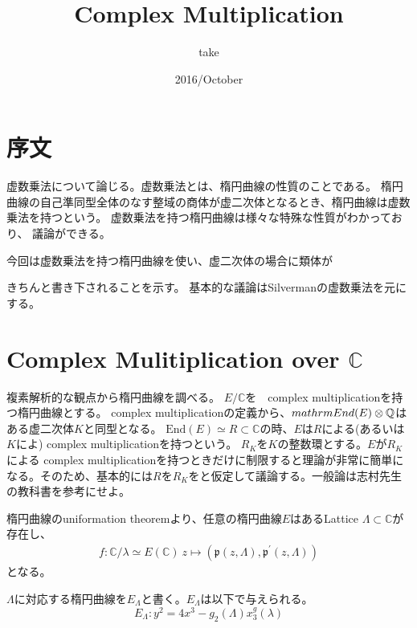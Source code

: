 \documentclass{ujarticle}
\title{Complex Multiplication}
\author{take}
\date{2016/October}
\begin{document}
\section{序文}
\label{sec:序文}
虚数乗法について論じる。虚数乗法とは、楕円曲線の性質のことである。
楕円曲線の自己準同型全体のなす整域の商体が虚二次体となるとき、楕円曲線は虚数乗法を持つという。
虚数乗法を持つ楕円曲線は様々な特殊な性質がわかっており、
議論ができる。

今回は虚数乗法を持つ楕円曲線を使い、虚二次体の場合に類体が

きちんと書き下されることを示す。
基本的な議論はSilvermanの虚数乗法を元にする。


\section{Complex Mulitiplication over $\mathbb{C}$}
\label{sec:Complex Mulitiplication over  mathbbC }

複素解析的な観点から楕円曲線を調べる。
$E/\mathbb{C}$を　complex multiplicationを持つ楕円曲線とする。 complex multiplicationの定義から、$\\mathrm{End}(E) \otimes \mathbb{Q}$はある虚二次体$K$と同型となる。
$\mathrm{End}(E) \simeq R \subset \mathbb{C} $の時、$E$は$R$による(あるいは$K$によ) complex multiplicationを持つという。
$R_K$を$K$の整数環とする。$E$が$R_K$による complex multiplicationを持つときだけに制限すると理論が非常に簡単になる。そのため、基本的には$R$を$R_K$をと仮定して議論する。一般論は志村先生の教科書を参考にせよ。

楕円曲線のuniformation theoremより、任意の楕円曲線$E$はあるLattice $\Lambda \subset \mathbb{C} $が存在し、
\begin{align*}
  f: \mathbb{C}/ \lambda \simeq E(\mathbb{C})   \
  z \mapsto (\mathfrak{p}(z, \Lambda),\mathfrak{p}^{'}(z, \Lambda))
\end{align*}
となる。

$\Lambda$に対応する楕円曲線を$E_{\Lambda}$と書く。$E_{\Lambda}$は以下で与えられる。
\begin{equation*}
E_{\Lambda}: y ^2 = 4x^3 - g_2(\Lambda)x ^g_3(\lambda)
\end{equation*}
\end{document}
